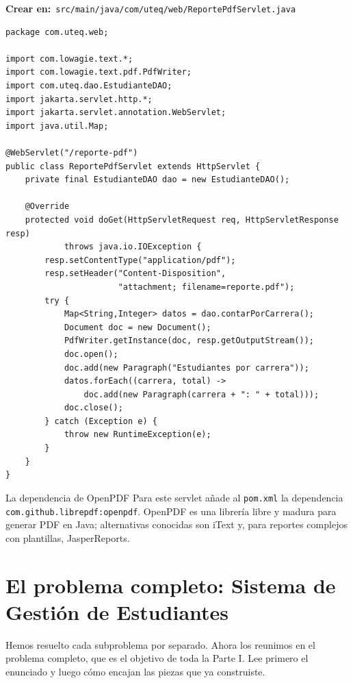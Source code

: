 \documentclass[11pt]{article}
\begin{document}
{\small\color{jwebazulo}\textbf{Crear en:}~}\texttt{src/\allowbreak{}main/\allowbreak{}java/\allowbreak{}com/\allowbreak{}uteq/\allowbreak{}web/\allowbreak{}Reporte\allowbreak{}Pdf\allowbreak{}Servlet.\allowbreak{}java}\par\nobreak\vspace{-1pt}
\begin{cajacodigo}
\begin{lstlisting}[style=java]
package com.uteq.web;

import com.lowagie.text.*;
import com.lowagie.text.pdf.PdfWriter;
import com.uteq.dao.EstudianteDAO;
import jakarta.servlet.http.*;
import jakarta.servlet.annotation.WebServlet;
import java.util.Map;

@WebServlet("/reporte-pdf")
public class ReportePdfServlet extends HttpServlet {
    private final EstudianteDAO dao = new EstudianteDAO();

    @Override
    protected void doGet(HttpServletRequest req, HttpServletResponse resp)
            throws java.io.IOException {
        resp.setContentType("application/pdf");
        resp.setHeader("Content-Disposition",
                       "attachment; filename=reporte.pdf");
        try {
            Map<String,Integer> datos = dao.contarPorCarrera();
            Document doc = new Document();
            PdfWriter.getInstance(doc, resp.getOutputStream());
            doc.open();
            doc.add(new Paragraph("Estudiantes por carrera"));
            datos.forEach((carrera, total) ->
                doc.add(new Paragraph(carrera + ": " + total)));
            doc.close();
        } catch (Exception e) {
            throw new RuntimeException(e);
        }
    }
}
\end{lstlisting}
\end{cajacodigo}
\vspace{2pt}
\begin{cajatip}{La dependencia de OpenPDF}
Para este servlet añade al \texttt{pom.\allowbreak{}xml} la dependencia \texttt{com.\allowbreak{}github.\allowbreak{}librepdf:\allowbreak{}openpdf}. OpenPDF es una librería libre y madura para generar PDF en Java; alternativas conocidas son iText y, para reportes complejos con plantillas, JasperReports.\par
\end{cajatip}
\section{El problema completo: Sistema de Gestión de Estudiantes}
Hemos resuelto cada subproblema por separado. Ahora los reunimos en el problema completo, que es el objetivo de toda la Parte I. Lee primero el enunciado y luego cómo encajan las piezas que ya construiste.
\end{document}
